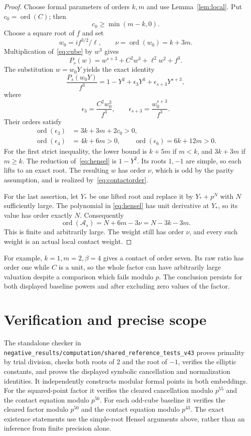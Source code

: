 \documentclass[11pt,a4paper]{article}
\theoremstyle{remark}\newtheorem{remark}[theorem]{Remark}
\begin{document}
\begin{proof}
Choose formal parameters of orders $k,m$ and use
Lemma~\ref{lem:local}. Put $c_0=\operatorname{ord}(C)$; then
\[
                         c_0\ge\min(m-k,0).
\]
Choose a square root of $f$ and set
\[
                   w_0=i f^{3/2}/\ell,
                   \qquad\nu=\operatorname{ord}(w_0)=k+3m.
\]
Multiplication of~\eqref{eq:cube} by $w^3$ gives
\[
 P_s(w)=w^{s+3}+C^2w^3+\ell^2w^2+f^3.
\]
The substitution $w=w_0Y$ yields the exact identity
\begin{equation}\label{eq:hensel}
 \frac{P_s(w_0Y)}{f^3}
   =1-Y^2+\epsilon_3Y^3+\epsilon_{s+3}Y^{s+3},
\end{equation}
where
\[
 \epsilon_3=\frac{C^2w_0^3}{f^3},\qquad
 \epsilon_{s+3}=\frac{w_0^{s+3}}{f^3}.
\]
Their orders satisfy
\[
 \begin{split}
 \operatorname{ord}(\epsilon_3)&=3k+3m+2c_0>0,\\
 \operatorname{ord}(\epsilon_4)&=4k+6m>0,\qquad
 \operatorname{ord}(\epsilon_6)=6k+12m>0.
 \end{split}
\]
For the first strict inequality, the lower bound is $k+5m$ if
$m<k$, and $3k+3m$ if $m\ge k$.
The reduction of~\eqref{eq:hensel} is $1-Y^2$.
Its roots $1,-1$ are simple, so each lifts to an exact root.
The resulting $w$ has order $\nu$, which is odd by the parity
assumption, and is realized by~\eqref{eq:contactorder}.

For the last assertion, let $Y_*$ be one lifted root and replace
it by $Y_*+p^N$ with $N$ sufficiently large. The polynomial in
\eqref{eq:hensel} has unit derivative at $Y_*$, so its value has
order exactly $N$. Consequently
\[
                 \operatorname{ord}(\mathcal A_s)
                      =N+6m-3\nu=N-3k-3m.
\]
This is finite and arbitrarily large. The weight still has order
$\nu$, and every such weight is an actual local contact weight.
\end{proof}

For example, $k=1,m=2,\beta=4$ gives a contact of order seven.
Its raw ratio has order one while $C$ is a unit, so the whole
factor can have arbitrarily large valuation despite a comparison
which fails modulo $p$. The conclusion persists for both displayed
baseline powers and after excluding zero values of the factor.

\section{Verification and precise scope}
The standalone checker in
\nolinkurl{negative_results/computation/shared_reference_tests_v43}
proves primality by trial division, checks both roots of $2$ and the
root of $-1$, verifies the elliptic constants, and proves the displayed
symbolic cancellation and normalization identities. It independently
constructs modular formal points in both embeddings. For the
squared-point factor it verifies the cleared cancellation modulo
$p^{55}$ and the contact equation modulo $p^{50}$. For each odd-cube
baseline it verifies the cleared factor modulo $p^{50}$ and the
contact equation modulo $p^{43}$. The exact existence statements
use the simple-root Hensel arguments above, rather than an inference
from finite precision alone.
\end{document}
